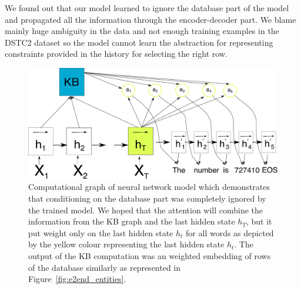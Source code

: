 \documentclass[11pt]{article}
\begin{document}
We found out that our model learned to ignore the database part of the model and propagated all the information through the encoder-decoder part.
We blame mainly huge ambiguity in the data and not enough training examples in the DSTC2 dataset so the model cannot learn the abstraction for representing constraints provided in the history for selecting the right row. 
\begin{figure}[!bt]
    \centering
    \includegraphics[width=1.0\linewidth]{encdecdb}
    \caption{Computational graph of neural network model which demonstrates that conditioning on the database part was completely ignored by the trained model. We hoped that the attention will combine the information from the KB graph and the last hidden state $h_T$, but it put weight only on the last hidden state $h_t$ for all words as depicted by the yellow colour representing the last hidden state $h_t$. The output of the KB computation was an weighted embedding of rows of the database similarly as represented in Figure~\ref{fig:e2end_entities}.}
\label{fig:e2end_fail}
\end{figure}
\end{document}
